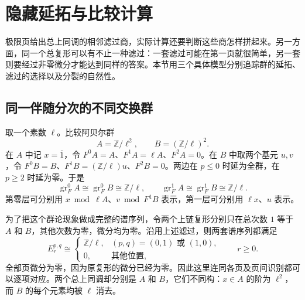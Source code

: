 
% 
% 

\section{隐藏延拓与比较计算}
\label{g2:sec:1005}

极限页给出总上同调的相邻滤过商，实际计算还要判断这些商怎样拼起来。另一方面，同一个总复形可以有不止一种滤过：一套滤过可能在第一页就很简单，另一套则要经过非零微分才能达到同样的答案。本节用三个具体模型分别追踪群的延拓、滤过的选择以及分裂的自然性。

\subsection{同一伴随分次的不同交换群}
\label{g2:subsec:1005:01}

取一个素数 \(\ell\)。比较阿贝尔群
\[
	A=\mathbb Z/\ell^2,\qquad B=(\mathbb Z/\ell)^2.
\]
在 \(A\) 中记 \(x=\overline1\)，令 \(F^0A=A\)、\(F^1A=\ell A\)、\(F^2A=0\)。在 \(B\) 中取两个基元 \(u,v\)，令 \(F^0B=B\)、\(F^1B=(\mathbb Z/\ell)u\)、\(F^2B=0\)。两边在 \(p\le0\) 时延为全群，在 \(p\ge2\) 时延为零。于是
\[
	\operatorname{gr}_F^0A\cong\operatorname{gr}_F^0B\cong\mathbb Z/\ell,
	\qquad
	\operatorname{gr}_F^1A\cong\operatorname{gr}_F^1B\cong\mathbb Z/\ell.
\]
第零层可分别用 \(x\bmod\ell A\)、\(v\bmod F^1B\) 表示，第一层可分别用 \(\ell x\)、\(u\) 表示。

\ProseParagraphBreak

为了把这个群论现象做成完整的谱序列，令两个上链复形分别只在总次数 \(1\) 等于 \(A\) 和 \(B\)，其他次数为零，微分均为零。沿用上述滤过，则两套谱序列都满足
\begin{equation}\label{g2:eq:same-pages-different-groups}
	E_r^{p,q}\cong
	\begin{cases}
		\mathbb Z/\ell,&(p,q)=(0,1)\text{ 或 }(1,0),\\
		0,&\text{其他位置},
	\end{cases}
	\qquad r\ge0.
\end{equation}
全部页微分为零，因为原复形的微分已经为零。因此这里连同各页及页间识别都可以逐项对应。两个总上同调却分别是 \(A\) 和 \(B\)，它们不同构：\(x\in A\) 的阶为 \(\ell^2\)，而 \(B\) 的每个元素均被 \(\ell\) 消去。

